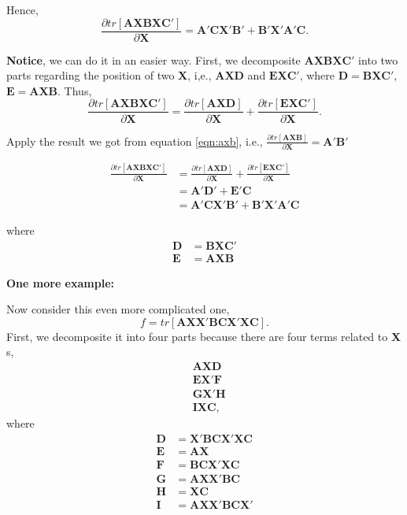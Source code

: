 \documentclass[10pt]{article}
\begin{document}
Hence,
\begin{equation}
		\frac{\partial tr[\bm{AXBXC}'] }{\partial \bm{X} } = \bm{A}'\bm{C}\bm{X}'\bm{B}'
		 + \bm{B}'\bm{X}'\bm{A}'\bm{C}.
\end{equation}


{\textbf {Notice}}, we can do it in an easier way.
First, we decomposite $ \bm{AXBXC}' $ into two parts regarding the position of two 
$ \bm{X} $, i,e., $ \bm{AXD} $ and $ \bm{EXC}' $, where $ \bm{D} =\bm{BXC}' $,
$ \bm{E} = \bm{AXB} $.
Thus,
\begin{equation*}
		\frac{\partial tr[\bm{AXBXC}'] }{\partial \bm{X} } = 
		\frac{\partial tr[\bm{AXD}] }{\partial \bm{X} } +
		\frac{\partial tr[\bm{EXC}'] }{\partial \bm{X} }.
\end{equation*}

Apply the result we got from equation \eqref{eqn:axb}, i.e., 
$ \frac{\partial tr[\bm{AXB}] }{\partial \bm{X} }=\bm{A}'\bm{B}' $

\begin{align*}
		\frac{\partial tr[\bm{AXBXC}'] }{\partial \bm{X} } &=
		\frac{\partial tr[\bm{AXD}] }{\partial \bm{X} } +
		\frac{\partial tr[\bm{EXC}'] }{\partial \bm{X} }\\
		&= \bm{A}'\bm{D}' + \bm{E}'\bm{C}\\
		&= \bm{A}'\bm{C}\bm{X}'\bm{B}' + \bm{B}'\bm{X}'\bm{A}'\bm{C}
\end{align*}

where 
\begin{align*}
\bm{D} &= \bm{BXC}'\\
\bm{E} &= \bm{AXB}
\end{align*}


{\textbf {One more example:}}

Now consider this even more complicated one,
\begin{equation*}
		f = tr[\bm{AX}\bm{X}'\bm{BCX}'\bm{XC}].
\end{equation*}
First, we decomposite it into four parts because there are four terms related to
$ \bm{X} $s,
\begin{align*}
&\bm{AXD}\\
&\bm{E}\bm{X'}\bm{F}\\
&\bm{GX}'\bm{H}\\
&\bm{IXC},
\end{align*}
where
\begin{align*}
\bm{D} &=  \bm{X}'\bm{BCX}'\bm{XC}  \\
\bm{E} &=  \bm{AX} \\
\bm{F} &=  \bm{BCX}'\bm{XC}  \\
\bm{G} &=  \bm{AX}\bm{X}'\bm{BC}  \\
\bm{H} &=  \bm{XC}  \\
\bm{I} &=  \bm{AX}\bm{X}'\bm{BCX}'  \\
\end{align*}
\end{document}
